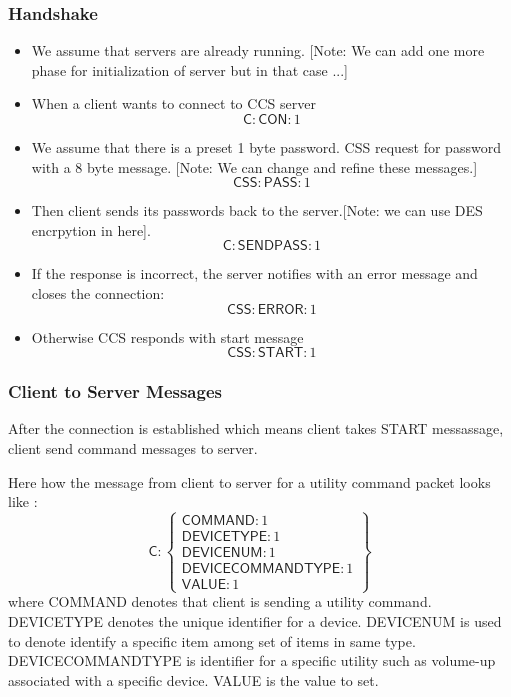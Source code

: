 \subsubsection{Handshake}
\label{sec:pdus:pdu:hs}
\begin{itemize}
\item We assume that servers are already running. [Note: We can add one more phase for initialization of server but in that case ...]
\item When a client wants to connect to \textsf{CCS} server
  \[ \textsf{C} : \textsf{CON} : 1\]
\item We assume that there is a preset 1 byte password. \textsf{CSS} request for password with a 8 byte message. [Note: We can change and refine these messages.]
  \[\textsf{CSS} : \textsf{PASS} : 1\]
  \item Then client sends its passwords back to the server.[Note: we can use DES encrpytion in here]. 
    \[\textsf{C} : \textsf{SENDPASS} : 1\]
  \item If the response is incorrect, the server notifies with an error message and closes the connection:
    \[\textsf{CSS}:\textsf{ERROR}:1\]
    \item Otherwise \textsf{CCS} responds with start message
      \[\textsf{CSS} : \textsf{START} : 1\]
    \end{itemize}

\subsubsection{Client to Server Messages}
\label{sec:pdus:pdu:c_to_s}

After the connection is established which means client takes \textsf{START} messassage, client send command messages to server. 

Here how the message from client to server for a utility command packet looks like :
\[
\textsf{C}:\left\{ \begin{array}{ll}  \textsf{COMMAND}:1\\
                                      \textsf{DEVICETYPE}:1 \\
                                       \textsf{DEVICENUM}:1 \\
                                      \textsf{DEVICECOMMANDTYPE}:1 \\
                                        \textsf{VALUE}:1

           \end{array} \right\}
\]                                        
where \textsf{COMMAND} denotes that client is sending a utility command. \textsf{DEVICETYPE} denotes the unique identifier for a device. \textsf{DEVICENUM} is used to denote identify a specific item among set of items in same type. \textsf{DEVICECOMMANDTYPE} is identifier for a specific utility such as volume-up associated with a specific device. \textsf{VALUE} is the value to set.


